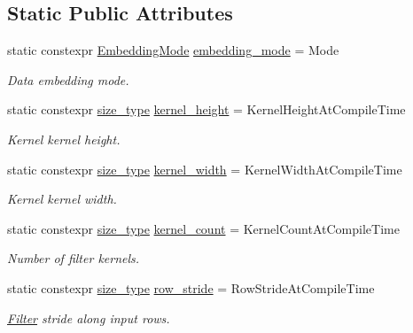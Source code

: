\subsection*{Static Public Attributes}
\begin{DoxyCompactItemize}
\item 
static constexpr \hyperlink{namespaceffnn_1_1layer_1_1convolution_ad420d4eb8edd7c254d1f0aaaad81017f}{Embedding\-Mode} \hyperlink{structffnn_1_1layer_1_1convolution_1_1options_a7befeba5b65e0442750d11713cedc816}{embedding\-\_\-mode} = Mode
\begin{DoxyCompactList}\small\item\em Data embedding mode. \end{DoxyCompactList}\item 
static constexpr \hyperlink{namespaceffnn_a63b90a2fd70eb76684eac482a51633e5}{size\-\_\-type} \hyperlink{structffnn_1_1layer_1_1convolution_1_1options_a36fbdfa26d8032268955f68e66f09662}{kernel\-\_\-height} = Kernel\-Height\-At\-Compile\-Time
\begin{DoxyCompactList}\small\item\em Kernel kernel height. \end{DoxyCompactList}\item 
static constexpr \hyperlink{namespaceffnn_a63b90a2fd70eb76684eac482a51633e5}{size\-\_\-type} \hyperlink{structffnn_1_1layer_1_1convolution_1_1options_a10296c3b7e5994a25b8c22f11b4252ca}{kernel\-\_\-width} = Kernel\-Width\-At\-Compile\-Time
\begin{DoxyCompactList}\small\item\em Kernel kernel width. \end{DoxyCompactList}\item 
static constexpr \hyperlink{namespaceffnn_a63b90a2fd70eb76684eac482a51633e5}{size\-\_\-type} \hyperlink{structffnn_1_1layer_1_1convolution_1_1options_a171b201743a4d63fac53b414980b24ea}{kernel\-\_\-count} = Kernel\-Count\-At\-Compile\-Time
\begin{DoxyCompactList}\small\item\em Number of filter kernels. \end{DoxyCompactList}\item 
static constexpr \hyperlink{namespaceffnn_a63b90a2fd70eb76684eac482a51633e5}{size\-\_\-type} \hyperlink{structffnn_1_1layer_1_1convolution_1_1options_af557eea786920cd6341ca8a0498d3791}{row\-\_\-stride} = Row\-Stride\-At\-Compile\-Time
\begin{DoxyCompactList}\small\item\em \hyperlink{structffnn_1_1layer_1_1convolution_1_1_filter}{Filter} stride along input rows. \end{DoxyCompactList}\item 

\end{DoxyCompactItemize}
